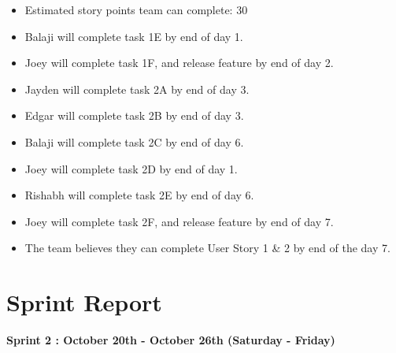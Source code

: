 \documentclass[12pt]{article}
\begin{document}
\begin{itemize}%
\item Estimated story points team can complete: 30
\item Balaji will complete task 1E by end of day 1.
\item Joey will complete task 1F, and release feature by end of day 2.
\item Jayden will complete task 2A by end of day 3.
\item Edgar will complete task 2B by end of day 3.
\item Balaji will complete task 2C by end of day 6.
\item Joey will complete task 2D by end of day 1.
\item Rishabh will complete task 2E by end of day 6.
\item Joey will complete task 2F, and release feature by end of day 7.
\item The team believes they can complete User Story 1 \& 2 by end of the day 7. 
\end{itemize}

\newpage

\section{Sprint Report}

\textbf{Sprint 2 : October 20th - October 26th (Saturday - Friday)}
\end{document}
